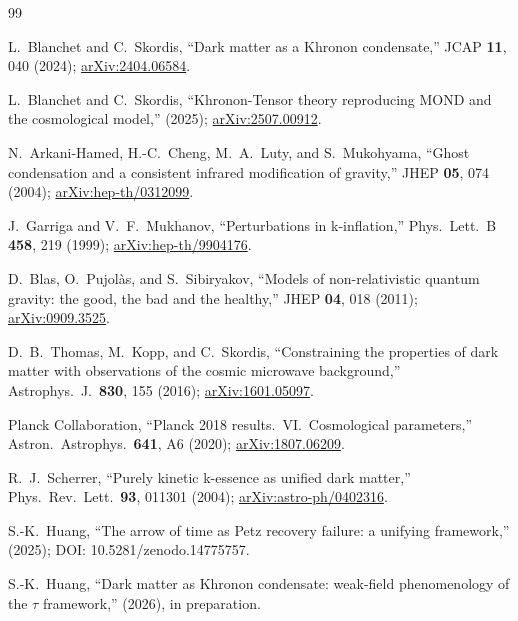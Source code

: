 \documentclass[prd,twocolumn,superscriptaddress,longbibliography,floatfix]{revtex4-2}
\newcommand{\tauasym}{\tau}
\begin{document}
\begin{thebibliography}{99}

L.~Blanchet and C.~Skordis,
``Dark matter as a Khronon condensate,''
JCAP \textbf{11}, 040 (2024);
\href{https://arxiv.org/abs/2404.06584}{arXiv:2404.06584}.

L.~Blanchet and C.~Skordis,
``Khronon-Tensor theory reproducing MOND and the cosmological model,''
(2025);
\href{https://arxiv.org/abs/2507.00912}{arXiv:2507.00912}.

N.~Arkani-Hamed, H.-C.~Cheng, M.~A.~Luty,
and S.~Mukohyama,
``Ghost condensation and a consistent infrared
modification of gravity,''
JHEP \textbf{05}, 074 (2004);
\href{https://arxiv.org/abs/hep-th/0312099}{arXiv:hep-th/0312099}.

J.~Garriga and V.~F.~Mukhanov,
``Perturbations in k-inflation,''
Phys.\ Lett.\ B \textbf{458}, 219 (1999);
\href{https://arxiv.org/abs/hep-th/9904176}{arXiv:hep-th/9904176}.

D.~Blas, O.~Pujol\`{a}s, and S.~Sibiryakov,
``Models of non-relativistic quantum gravity:
the good, the bad and the healthy,''
JHEP \textbf{04}, 018 (2011);
\href{https://arxiv.org/abs/0909.3525}{arXiv:0909.3525}.

D.~B.~Thomas, M.~Kopp, and C.~Skordis,
``Constraining the properties of dark matter with
observations of the cosmic microwave background,''
Astrophys.\ J.\ \textbf{830}, 155 (2016);
\href{https://arxiv.org/abs/1601.05097}{arXiv:1601.05097}.

Planck Collaboration,
``Planck 2018 results.\ VI.\ Cosmological
parameters,''
Astron.\ Astrophys.\ \textbf{641}, A6 (2020);
\href{https://arxiv.org/abs/1807.06209}{arXiv:1807.06209}.

R.~J.~Scherrer,
``Purely kinetic k-essence as unified dark matter,''
Phys.\ Rev.\ Lett.\ \textbf{93}, 011301 (2004);
\href{https://arxiv.org/abs/astro-ph/0402316}{arXiv:astro-ph/0402316}.

S.-K.~Huang,
``The arrow of time as Petz recovery failure:
a unifying framework,''
(2025);
DOI: 10.5281/zenodo.14775757.

S.-K.~Huang,
``Dark matter as Khronon condensate: weak-field
phenomenology of the $\tauasym$ framework,''
(2026), in preparation.

\end{thebibliography}
\end{document}
